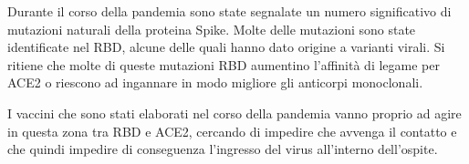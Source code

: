 Durante il corso della pandemia sono state segnalate un numero significativo di mutazioni naturali della proteina Spike. Molte delle mutazioni sono state identificate nel RBD, alcune delle quali hanno dato origine a varianti virali. Si ritiene che molte di queste mutazioni RBD aumentino l'affinità di legame per ACE2 o riescono ad ingannare in modo migliore gli anticorpi monoclonali.  

I vaccini che sono stati elaborati nel corso della pandemia vanno proprio ad agire in questa zona tra RBD e ACE2, cercando di impedire che avvenga il contatto e che quindi impedire di conseguenza l'ingresso del virus all'interno dell'ospite.
